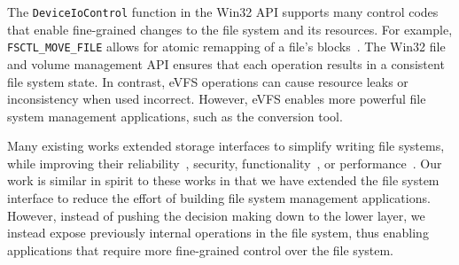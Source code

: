 The \texttt{DeviceIoControl} function in the Win32 API supports many control codes that enable fine-grained changes to the file system and its resources. For example, \texttt{FSCTL\_MOVE\_FILE} allows for atomic remapping of a file's blocks~\cite{win32-defrag}. The Win32 file and volume management API ensures that each operation results in a consistent file system state. In contrast, eVFS operations can cause resource leaks or inconsistency when used incorrect. However, eVFS enables more powerful file system management applications, such as the conversion tool. 



Many existing works extended storage interfaces to simplify writing file systems, while improving their reliability~\cite{Sivathanu06}, security, functionality~\cite{shin2016isotope}, or performance~\cite{zhang2012nameless,anand08rangewrites}. Our work is similar in spirit to these works in that we have extended the file system interface to reduce the effort of building file system management applications. However, instead of pushing the decision making down to the lower layer, we instead expose previously internal operations in the file system, thus enabling applications that require more fine-grained control over the file system.


